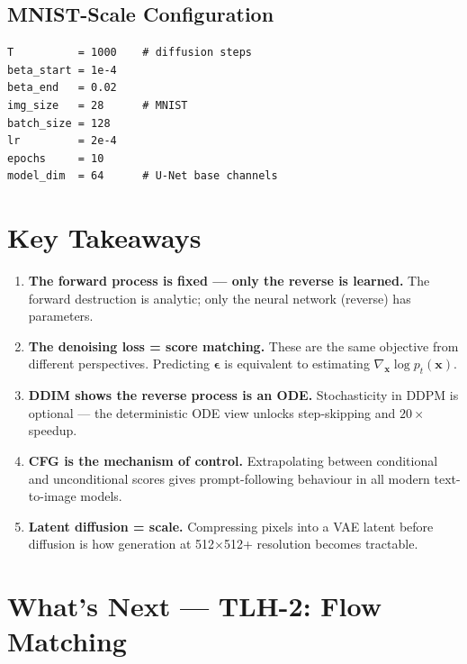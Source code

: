 \documentclass[11pt, a4paper]{article}
\theoremstyle{definition}
\newcommand{\bx}{\bm{x}}
\newcommand{\bepsilon}{\bm{\epsilon}}
\begin{document}
\subsection{MNIST-Scale Configuration}

\begin{lstlisting}[caption={Hyperparameters for MNIST demo (runs on CPU in ~5 minutes)}]
T          = 1000    # diffusion steps
beta_start = 1e-4
beta_end   = 0.02
img_size   = 28      # MNIST
batch_size = 128
lr         = 2e-4
epochs     = 10
model_dim  = 64      # U-Net base channels
\end{lstlisting}

\section{Key Takeaways}

\begin{enumerate}
  \item \textbf{The forward process is fixed — only the reverse is learned.} The forward
        destruction is analytic; only the neural network (reverse) has parameters.

  \item \textbf{The denoising loss = score matching.} These are the same objective from
        different perspectives. Predicting $\bepsilon$ is equivalent to estimating
        $\nabla_\bx \log p_t(\bx)$.

  \item \textbf{DDIM shows the reverse process is an ODE.} Stochasticity in DDPM is optional
        — the deterministic ODE view unlocks step-skipping and $20\times$ speedup.

  \item \textbf{CFG is the mechanism of control.} Extrapolating between conditional and
        unconditional scores gives prompt-following behaviour in all modern text-to-image models.

  \item \textbf{Latent diffusion = scale.} Compressing pixels into a VAE latent before
        diffusion is how generation at 512$\times$512+ resolution becomes tractable.
\end{enumerate}

\section{What's Next — TLH-2: Flow Matching}
\end{document}
